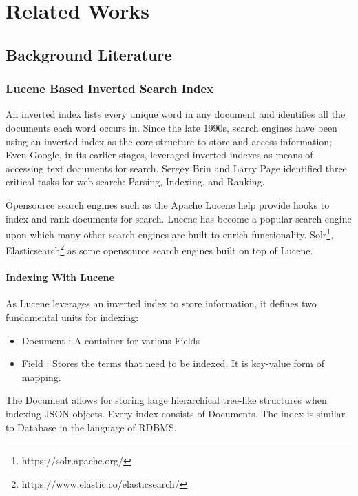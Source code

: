 \chapter{Related Works}
\label{relatedwork}

\section{Background Literature}
\label{relatedwork:background}

\subsection{Lucene Based Inverted Search Index}
An inverted index lists every unique word in any document and identifies all the documents each word occurs in. Since the late 1990s, search engines have been using an inverted index as the core structure to store and access information; Even Google, in its earlier stages, leveraged inverted indexes as means of accessing text documents for search\parencite{brin1998anatomy}. Sergey Brin and Larry Page identified three critical tasks for web search: Parsing, Indexing, and Ranking.

Opensource search engines such as the Apache Lucene\parencite{lucene2010apache} help provide hooks to index and rank documents for search. Lucene has become a popular search engine upon which many other search engines are built to enrich functionality. Solr\footnote{https://solr.apache.org/}, Elasticsearch\footnote{https://www.elastic.co/elasticsearch/} as some opensource search engines built on top of Lucene. 

\subsubsection{Indexing With Lucene}
As Lucene leverages an inverted index to store information, it defines two fundamental units for indexing:
\begin{itemize}
    \item Document : A container for various Fields
    \item Field : Stores the terms that need to be indexed. It is key-value form of mapping. 
\end{itemize}
The Document allows for storing large hierarchical tree-like structures when indexing JSON objects. Every index consists of Documents. The index is similar to Database in the language of RDBMS. 

